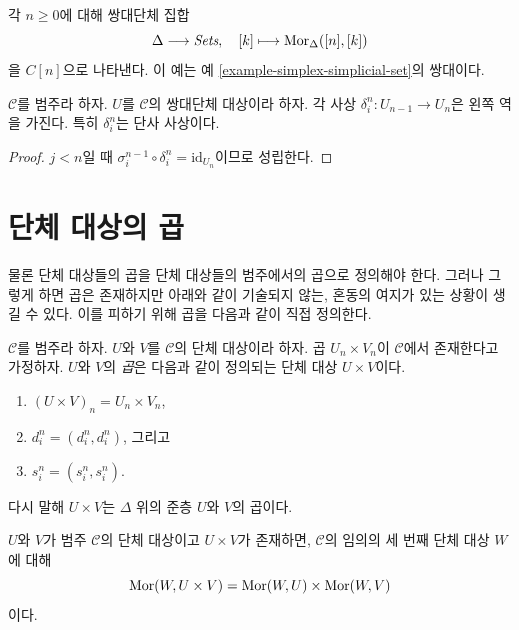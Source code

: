 \begin{example}
\label{example-simplex-cosimplicial-set}
각 $n \geq 0$에 대해 쌍대단체 집합
$$
\Delta \longrightarrow \textit{Sets},\quad
[k] \longmapsto \mathop{\mathrm{Mor}}\nolimits_{\Delta}([n], [k])
$$
을 $C[n]$으로 나타낸다.
이 예는 예 \ref{example-simplex-simplicial-set}의 쌍대이다.
\end{example}

\begin{lemma}
\label{lemma-di-injective}
$\mathcal{C}$를 범주라 하자.
$U$를 $\mathcal{C}$의 쌍대단체 대상이라 하자.
각 사상 $\delta^n_i : U_{n - 1} \to U_n$은 왼쪽 역을 가진다.
특히 $\delta^n_i$는 단사 사상이다.
\end{lemma}

\begin{proof}
$j < n$일 때
$\sigma_i^{n - 1} \circ \delta^n_i = \text{id}_{U_n}$이므로 성립한다.
\end{proof}



\section{단체 대상의 곱}
\label{section-products}

\noindent
물론 단체 대상들의 곱을 단체 대상들의 범주에서의 곱으로 정의해야 한다.
그러나 그렇게 하면 곱은 존재하지만 아래와 같이 기술되지 않는,
혼동의 여지가 있는 상황이 생길 수 있다. 이를 피하기 위해 곱을
다음과 같이 직접 정의한다.

\begin{definition}
\label{definition-product}
$\mathcal{C}$를 범주라 하자.
$U$와 $V$를 $\mathcal{C}$의 단체 대상이라 하자.
곱 $U_n \times V_n$이 $\mathcal{C}$에서 존재한다고 가정하자.
{$U$와 $V$의 {\it 곱}}은 다음과 같이 정의되는 단체 대상
$U \times V$이다.
\begin{enumerate}
\item $(U \times V)_n = U_n \times V_n$,
\item $d^n_i = (d^n_i, d^n_i)$, 그리고
\item $s^n_i = (s^n_i, s^n_i)$.
\end{enumerate}
다시 말해 $U \times V$는 $\Delta$ 위의 준층 $U$와 $V$의 곱이다.
\end{definition}

\begin{lemma}
\label{lemma-product}
$U$와 $V$가 범주 $\mathcal{C}$의 단체 대상이고
$U \times V$가 존재하면, $\mathcal{C}$의 임의의 세 번째 단체 대상
$W$에 대해
$$
\mathop{\mathrm{Mor}}\nolimits(W, U \times V) =
\mathop{\mathrm{Mor}}\nolimits(W, U) \times
\mathop{\mathrm{Mor}}\nolimits(W, V)
$$
이다.
\end{lemma}

